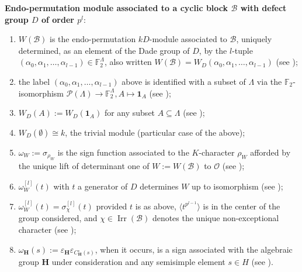 \documentclass[12pt]{amsart}
\newcommand{\cO}{{\mathcal{O}}}
\DeclareMathOperator{\Irr}{Irr}
\theoremstyle{theorem}
\theoremstyle{definition}
\theoremstyle{remark}
\begin{document}
\noindent\textbf{Endo-permutation module associated to a cyclic block 
                 $\mathcal{B}$ with defect group $D$ of order $p^l$}:
\begin{enumerate}[label=$\bullet$, leftmargin=5mm]
	\item  $W(\mathcal{B})$ is the endo-permutation $kD$-module 
               associated to $\mathcal{B}$, uniquely determined, as an element 
               of the Dade group of $D$, by the $l$-tuple
               $(\alpha_0, \alpha_1, \ldots, \alpha_{l-1} )\in \mathbb{F}_2^{\Lambda}$,  
               also written 
               $W(\mathcal{B})=W_{D}(\alpha_0, \alpha_1, \ldots, \alpha_{l-1})$  
               (see \cite[Subsection 3.1]{HL24}); 
	\item  the label $(\alpha_0, \alpha_1, \ldots, \alpha_{l-1})$ above is 
               identified with a subset of $\Lambda$ via the $\mathbb{F}_{2}$-isomorphism  
               $\mathcal{P}(\Lambda)\rightarrow  \mathbb{F}_2^{\Lambda}, 
               A\mapsto \mathbf{1}_{A}$  (see \cite[Subsections 2.2 and 2.3]{HL25});
	\item  $W_D(A) := W_D(\mathbf{1}_A)$  for any subset $A\subseteq \Lambda$ 
               (see \cite[Definition~2.3.1]{HL25});
        \item  $W_D( \emptyset ) \cong k$, the trivial module  (particular case of the above);
	\item  $\omega_{W}:=\sigma_{\rho^{}_{W}}$ is the sign function associated 
               to  the $K$-character $\rho^{}_{W}$ afforded by the unique lift of 
               determinant one of $W:=W(\mathcal{B})$ to $\cO$  
               (see \cite[Subsection 3.1]{HL24}); 
	         
	\item  $\omega_{W}^{[l]}(t)$ with $t$ a generator of $D$ determines $W$ 
               up to isomorphism (see \cite[Lemma~2.3.2]{HL25});
	\item  $\omega_W^{[l]}( t )=\sigma_{\chi}^{[l]}( t )$  provided $t$ is 
               as above, $\langle t^{p^{l-1}} \rangle$  is in the center of the 
               group considered, and  $\chi\in \Irr(\mathcal{B})$ denotes the 
               unique non-exceptional character  (see \cite[Remark~2.3.3]{HL25});
	\item  $\omega_{\mathbf{H}}( s ) := 
               \varepsilon_{\mathbf{H}}\varepsilon_{C^{\circ}_{\mathbf{H}}(s)}$, 
               when it occurs, is a sign associated with the algebraic group 
               $\mathbf{H}$ under consideration  and any  semisimple element 
               $s\in H$ (see \cite[Definition 2.5.6]{HL25}). 
\end{enumerate}
\smallskip
\end{document}
